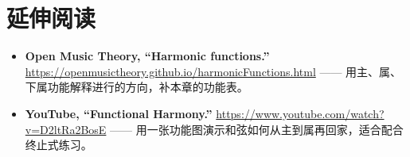\section*{延伸阅读}
\begin{itemize}
  \item \textbf{Open Music Theory, “Harmonic functions.”} \url{https://openmusictheory.github.io/harmonicFunctions.html} —— 用主、属、下属功能解释进行的方向，补本章的功能表。
  \item \textbf{YouTube, “Functional Harmony.”} \url{https://www.youtube.com/watch?v=D2ltRa2BosE} —— 用一张功能图演示和弦如何从主到属再回家，适合配合终止式练习。
\end{itemize}

